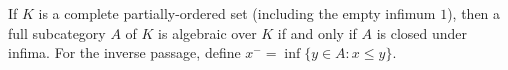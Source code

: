 If $K$ is a complete partially-ordered set (including the empty infimum $1$), then a full subcategory $A$ of $K$ is algebraic over $K$ if and only if $A$ is closed under infima. For the inverse passage, define $x^{-} = \inf\{y \in A : x \leqslant y\}$.
